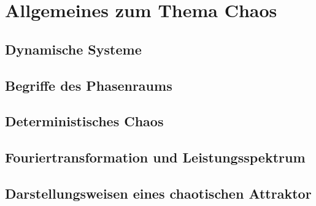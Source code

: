 

\section{Allgemeines zum Thema Chaos}
\label{sec:allgemeines}

\subsection{Dynamische Systeme}
\label{sub:dynamSys}

\subsection{Begriffe des Phasenraums}
\label{sub:phasenraum}

\subsection{Deterministisches Chaos}
\label{sub:determChaos}

\subsection{Fouriertransformation und Leistungsspektrum}
\label{sub:fouriertrafo}

\subsection{Darstellungsweisen eines chaotischen Attraktor}
\label{sub:darstellungAttraktor}